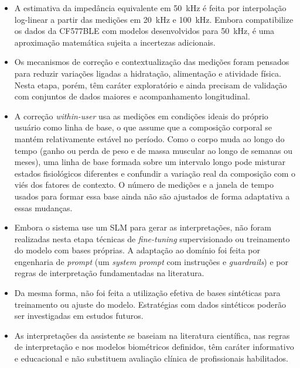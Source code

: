 \begin{itemize}
    \item A estimativa da impedância equivalente em 50~kHz é feita por interpolação
    log-linear a partir das medições em 20~kHz e 100~kHz. Embora compatibilize os dados da
    CF577BLE com modelos desenvolvidos para 50~kHz, é uma aproximação matemática sujeita a
    incertezas adicionais.

    \item Os mecanismos de correção e contextualização das medições foram pensados para
    reduzir variações ligadas a hidratação, alimentação e atividade física. Nesta etapa,
    porém, têm caráter exploratório e ainda precisam de validação com conjuntos de dados
    maiores e acompanhamento longitudinal.

    \item A correção \emph{within-user} usa as medições em condições ideais do próprio
    usuário como linha de base, o que assume que a composição corporal se mantém relativamente
    estável no período. Como o corpo muda ao longo do tempo (ganho ou perda de peso e de massa
    muscular ao longo de semanas ou meses), uma linha de base formada sobre um intervalo longo
    pode misturar estados fisiológicos diferentes e confundir a variação real da composição com
    o viés dos fatores de contexto. O número de medições e a janela de tempo usados para formar
    essa base ainda não são ajustados de forma adaptativa a essas mudanças.

    \item Embora o sistema use um SLM para gerar as interpretações, não foram realizadas nesta
    etapa técnicas de \emph{fine-tuning} supervisionado ou treinamento do modelo com bases
    próprias. A adaptação ao domínio foi feita por engenharia de \emph{prompt} (um \emph{system
    prompt} com instruções e \emph{guardrails}) e por regras de interpretação fundamentadas na
    literatura.

    \item Da mesma forma, não foi feita a utilização efetiva de bases sintéticas para
    treinamento ou ajuste do modelo. Estratégias com dados sintéticos poderão ser
    investigadas em estudos futuros.

    \item As interpretações da assistente se baseiam na literatura científica, nas regras de
    interpretação e nos modelos biométricos definidos, têm caráter informativo e educacional
    e não substituem avaliação clínica de profissionais habilitados.
\end{itemize}
